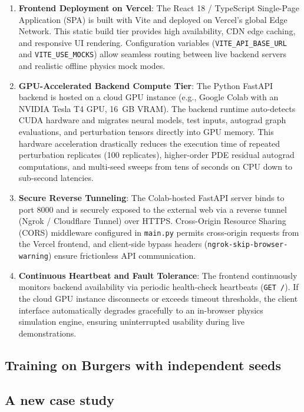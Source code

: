 \documentclass[12pt,singleside,a4paper]{article}
\begin{document}
\begin{enumerate}
    \item \textbf{Frontend Deployment on Vercel}:
    The React 18 / TypeScript Single-Page Application (SPA) is built with Vite and deployed on Vercel's global Edge Network. This static build tier provides high availability, CDN edge caching, and responsive UI rendering. Configuration variables (\texttt{VITE\_API\_BASE\_URL} and \texttt{VITE\_USE\_MOCKS}) allow seamless routing between live backend servers and realistic offline physics mock modes.

    \item \textbf{GPU-Accelerated Backend Compute Tier}:
    The Python FastAPI backend is hosted on a cloud GPU instance (e.g., Google Colab with an NVIDIA Tesla T4 GPU, 16~GB VRAM). The backend runtime auto-detects CUDA hardware and migrates neural models, test inputs, autograd graph evaluations, and perturbation tensors directly into GPU memory. This hardware acceleration drastically reduces the execution time of repeated perturbation replicates (100 replicates), higher-order PDE residual autograd computations, and multi-seed sweeps from tens of seconds on CPU down to sub-second latencies.

    \item \textbf{Secure Reverse Tunneling}:
    The Colab-hosted FastAPI server binds to port 8000 and is securely exposed to the external web via a reverse tunnel (Ngrok / Cloudflare Tunnel) over HTTPS. Cross-Origin Resource Sharing (CORS) middleware configured in \texttt{main.py} permits cross-origin requests from the Vercel frontend, and client-side bypass headers (\texttt{ngrok-skip-browser-warning}) ensure frictionless API communication.

    \item \textbf{Continuous Heartbeat and Fault Tolerance}:
    The frontend continuously monitors backend availability via periodic health-check heartbeats (\texttt{GET /}). If the cloud GPU instance disconnects or exceeds timeout thresholds, the client interface automatically degrades gracefully to an in-browser physics simulation engine, ensuring uninterrupted usability during live demonstrations.
\end{enumerate}
\subsection{Training on Burgers with independent seeds}

\subsection{A new case study}
\end{document}
